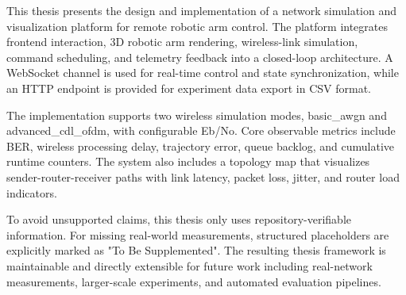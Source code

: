 {}

\begin{abstracten}
This thesis presents the design and implementation of a network simulation and visualization platform for remote robotic arm control. The platform integrates frontend interaction, 3D robotic arm rendering, wireless-link simulation, command scheduling, and telemetry feedback into a closed-loop architecture. A WebSocket channel is used for real-time control and state synchronization, while an HTTP endpoint is provided for experiment data export in CSV format.

The implementation supports two wireless simulation modes, basic\_awgn and advanced\_cdl\_ofdm, with configurable Eb/No. Core observable metrics include BER, wireless processing delay, trajectory error, queue backlog, and cumulative runtime counters. The system also includes a topology map that visualizes sender-router-receiver paths with link latency, packet loss, jitter, and router load indicators.

To avoid unsupported claims, this thesis only uses repository-verifiable information. For missing real-world measurements, structured placeholders are explicitly marked as "To Be Supplemented". The resulting thesis framework is maintainable and directly extensible for future work including real-network measurements, larger-scale experiments, and automated evaluation pipelines.
\end{abstracten}
